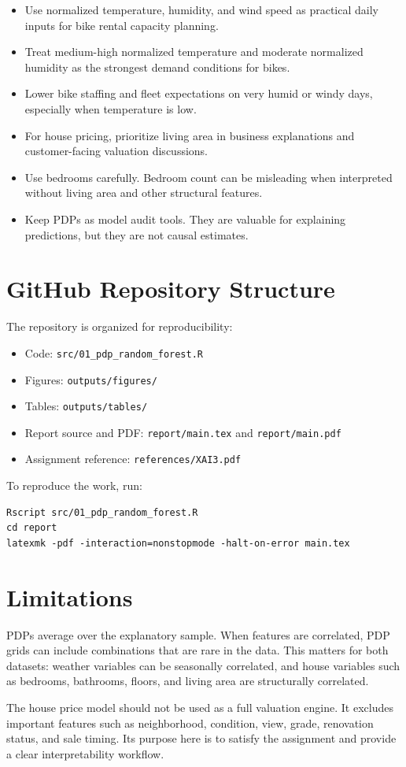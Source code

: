 \documentclass[11pt,a4paper]{article}
\begin{document}
\begin{itemize}
    \item Use normalized temperature, humidity, and wind speed as practical daily inputs for bike rental capacity planning.
    \item Treat medium-high normalized temperature and moderate normalized humidity as the strongest demand conditions for bikes.
    \item Lower bike staffing and fleet expectations on very humid or windy days, especially when temperature is low.
    \item For house pricing, prioritize living area in business explanations and customer-facing valuation discussions.
    \item Use bedrooms carefully. Bedroom count can be misleading when interpreted without living area and other structural features.
    \item Keep PDPs as model audit tools. They are valuable for explaining predictions, but they are not causal estimates.
\end{itemize}

\section{GitHub Repository Structure}

The repository is organized for reproducibility:
\begin{itemize}
    \item Code: \texttt{src/01\_pdp\_random\_forest.R}
    \item Figures: \texttt{outputs/figures/}
    \item Tables: \texttt{outputs/tables/}
    \item Report source and PDF: \texttt{report/main.tex} and \texttt{report/main.pdf}
    \item Assignment reference: \texttt{references/XAI3.pdf}
\end{itemize}

To reproduce the work, run:
\begin{verbatim}
Rscript src/01_pdp_random_forest.R
cd report
latexmk -pdf -interaction=nonstopmode -halt-on-error main.tex
\end{verbatim}

\section{Limitations}

PDPs average over the explanatory sample. When features are correlated, PDP grids can include combinations that are rare in the data. This matters for both datasets: weather variables can be seasonally correlated, and house variables such as bedrooms, bathrooms, floors, and living area are structurally correlated.

The house price model should not be used as a full valuation engine. It excludes important features such as neighborhood, condition, view, grade, renovation status, and sale timing. Its purpose here is to satisfy the assignment and provide a clear interpretability workflow.
\end{document}

